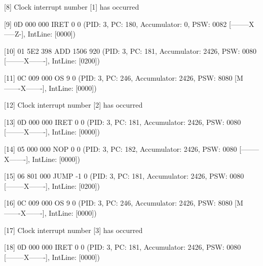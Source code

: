 	[\textcolor{termred}{8}] \textcolor{termcyan}{Clock interrupt number [1] has occurred}

[\textcolor{termred}{9}] {0D 000 000} IRET 0 0 (PID: \textcolor{termgreen}{3}, PC: \textcolor{termred}{180}, Accumulator: \textcolor{termred}{0}, PSW: \textcolor{termred}{0082} [\textcolor{termred}{--------X-----Z-}], IntLine: [\textcolor{termred}{0000}])

[\textcolor{termred}{10}] {01 5E2 398} ADD 1506 920 (PID: \textcolor{termgreen}{3}, PC: \textcolor{termred}{181}, Accumulator: \textcolor{termred}{2426}, PSW: \textcolor{termred}{0080} [\textcolor{termred}{--------X-------}], IntLine: [\textcolor{termred}{0200}])

[\textcolor{termred}{11}] {0C 009 000} OS 9 0 (PID: \textcolor{termgreen}{3}, PC: \textcolor{termred}{246}, Accumulator: \textcolor{termred}{2426}, PSW: \textcolor{termred}{8080} [\textcolor{termred}{M-------X-------}], IntLine: [\textcolor{termred}{0000}])

	[\textcolor{termred}{12}] \textcolor{termcyan}{Clock interrupt number [2] has occurred}

[\textcolor{termred}{13}] {0D 000 000} IRET 0 0 (PID: \textcolor{termgreen}{3}, PC: \textcolor{termred}{181}, Accumulator: \textcolor{termred}{2426}, PSW: \textcolor{termred}{0080} [\textcolor{termred}{--------X-------}], IntLine: [\textcolor{termred}{0000}])

[\textcolor{termred}{14}] {05 000 000} NOP 0 0 (PID: \textcolor{termgreen}{3}, PC: \textcolor{termred}{182}, Accumulator: \textcolor{termred}{2426}, PSW: \textcolor{termred}{0080} [\textcolor{termred}{--------X-------}], IntLine: [\textcolor{termred}{0000}])

[\textcolor{termred}{15}] {06 801 000} JUMP -1 0 (PID: \textcolor{termgreen}{3}, PC: \textcolor{termred}{181}, Accumulator: \textcolor{termred}{2426}, PSW: \textcolor{termred}{0080} [\textcolor{termred}{--------X-------}], IntLine: [\textcolor{termred}{0200}])

[\textcolor{termred}{16}] {0C 009 000} OS 9 0 (PID: \textcolor{termgreen}{3}, PC: \textcolor{termred}{246}, Accumulator: \textcolor{termred}{2426}, PSW: \textcolor{termred}{8080} [\textcolor{termred}{M-------X-------}], IntLine: [\textcolor{termred}{0000}])

	[\textcolor{termred}{17}] \textcolor{termcyan}{Clock interrupt number [3] has occurred}

[\textcolor{termred}{18}] {0D 000 000} IRET 0 0 (PID: \textcolor{termgreen}{3}, PC: \textcolor{termred}{181}, Accumulator: \textcolor{termred}{2426}, PSW: \textcolor{termred}{0080} [\textcolor{termred}{--------X-------}], IntLine: [\textcolor{termred}{0000}])

